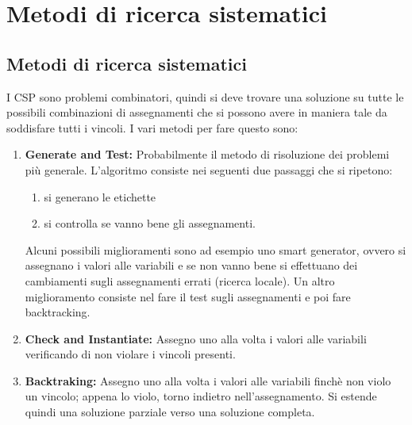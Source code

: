 \chapter{Metodi di ricerca sistematici} \label{ch:Metodi di ricerca sistematici}
\section{Metodi di ricerca sistematici}
I CSP sono problemi combinatori, quindi si deve trovare una soluzione su tutte le possibili combinazioni di assegnamenti che si possono avere in maniera tale da soddisfare tutti i vincoli. I vari metodi per fare questo sono:
\begin{enumerate}
    \item \textbf{Generate and Test: }Probabilmente il metodo di risoluzione dei problemi più generale. L’algoritmo consiste nei seguenti due passaggi che si ripetono:
    \begin{enumerate}
        \item si generano le etichette
        \item si controlla se vanno bene gli assegnamenti.
    \end{enumerate}
    Alcuni possibili miglioramenti sono ad esempio uno smart generator, ovvero si assegnano i valori alle variabili e se non vanno bene si effettuano dei cambiamenti sugli assegnamenti errati (ricerca locale). Un altro miglioramento consiste nel fare il test sugli assegnamenti e poi fare backtracking.
    \item \textbf{Check and Instantiate: }Assegno uno alla volta i valori alle variabili verificando di non violare i vincoli presenti.
    \item \textbf{Backtraking:} Assegno uno alla volta i valori alle variabili finchè non violo un vincolo; appena lo violo, torno indietro nell’assegnamento. Si estende quindi una soluzione parziale verso una soluzione completa.
\end{enumerate}
\newpage
